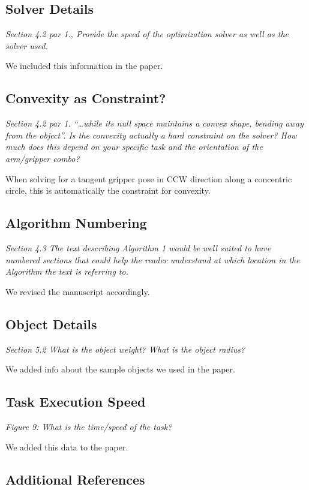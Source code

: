 \documentclass[letterpaper, 10 pt, twocolumn, conference]{article}
\begin{document}
\subsection{Solver Details}
\textit{Section 4.2 par 1., Provide the speed of the optimization solver as well as the solver used.}

We included this information in the paper.

\subsection{Convexity as Constraint?}
\textit{Section 4.2 par 1. “…while its null space maintains a convex shape, bending away from the object”. Is the convexity actually a hard constraint on the solver? How much does this depend on your specific task and the orientation of the arm/gripper combo?}

When solving for a tangent gripper pose in CCW direction along a concentric circle, this is automatically the constraint for convexity.

\subsection{Algorithm Numbering}
\textit{Section 4.3 The text describing Algorithm 1 would be well suited to have numbered sections that could help the reader understand at which location in the Algorithm the text is referring to.}

We revised the manuscript accordingly. 

\subsection{Object Details}
\textit{Section 5.2 What is the object weight? What is the object radius?}

We added info about the sample objects we used in the paper.

\subsection{Task Execution Speed}
\textit{Figure 9: What is the time/speed of the task?}

We added this data to the paper. 

\subsection{Additional References}
\end{document}
